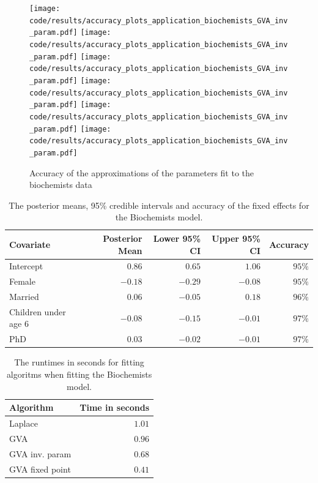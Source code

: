 \begin{figure}[h]
\centering
	\texttt{[image: code/results/accuracy\_plots\_application\_biochemists\_GVA\_inv\_param.pdf]}
	\texttt{[image: code/results/accuracy\_plots\_application\_biochemists\_GVA\_inv\_param.pdf]}
	\texttt{[image: code/results/accuracy\_plots\_application\_biochemists\_GVA\_inv\_param.pdf]}
	\texttt{[image: code/results/accuracy\_plots\_application\_biochemists\_GVA\_inv\_param.pdf]}
	\texttt{[image: code/results/accuracy\_plots\_application\_biochemists\_GVA\_inv\_param.pdf]}
	\texttt{[image: code/results/accuracy\_plots\_application\_biochemists\_GVA\_inv\_param.pdf]}
\label{fig:biochemists}
\caption{Accuracy of the approximations of the parameters fit to the biochemists data}
\end{figure}

\begin{table}
	\begin{tabular}{|l|rrrr|}
		\hline
		Covariate          & Posterior Mean & Lower 95\% CI & Upper 95\% CI & Accuracy \\
		\hline
		Intercept & $0.86$ & $0.65$ & $1.06$ &  $95\%$ \\
		Female & $-0.18$ & $-0.29$ & $-0.08$ &  $95\%$ \\
		Married & $0.06$ & $-0.05$ & $0.18$ & $96\%$ \\
		Children under age 6 & $-0.08$ & $-0.15$ & $-0.01$ & $97\%$ \\
		PhD & $0.03$ & $-0.02$ & $-0.01$ & $97\%$ \\
		\hline
	\end{tabular}			
	\label{tab:biochemists_results}
	\caption{The posterior means, 95\% credible intervals and accuracy of the fixed effects for the 
						Biochemists model.}
\end{table}

\begin{table}
	\begin{tabular}{|l|r|}
	\hline
	Algorithm & Time in seconds \\
	\hline
	Laplace & $1.01$ \\
	GVA & $0.96$ \\
	GVA inv. param & $0.68$ \\
	GVA fixed point & $0.41$ \\
	\hline
	\end{tabular}
	\label{tab:biochemists_runtime}
	\caption{The runtimes in seconds for fitting algoritms when fitting the Biochemists model.}
\end{table}

